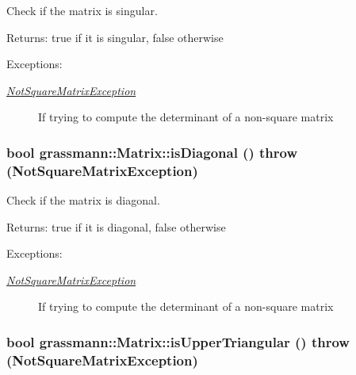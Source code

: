 Check if the matrix is singular. 

\begin{Desc}
\item[Returns:]true if it is singular, false otherwise \end{Desc}
\begin{Desc}
\item[Exceptions:]
\begin{description}
\item[{\em \hyperlink{classgrassmann_1_1NotSquareMatrixException}{NotSquareMatrixException}}]If trying to compute the determinant of a non-square matrix \end{description}
\end{Desc}
\hypertarget{classgrassmann_1_1Matrix_0ec5a24568e808ce4fc48514842e7633}{
\subsubsection[isDiagonal]{\setlength{\rightskip}{0pt plus 5cm}bool grassmann::Matrix::isDiagonal ()  throw ({\bf NotSquareMatrixException})}}
\label{classgrassmann_1_1Matrix_0ec5a24568e808ce4fc48514842e7633}


Check if the matrix is diagonal. 

\begin{Desc}
\item[Returns:]true if it is diagonal, false otherwise \end{Desc}
\begin{Desc}
\item[Exceptions:]
\begin{description}
\item[{\em \hyperlink{classgrassmann_1_1NotSquareMatrixException}{NotSquareMatrixException}}]If trying to compute the determinant of a non-square matrix \end{description}
\end{Desc}
\hypertarget{classgrassmann_1_1Matrix_9e2ca56c045111a88dd23583c4d03f8e}{
\subsubsection[isUpperTriangular]{\setlength{\rightskip}{0pt plus 5cm}bool grassmann::Matrix::isUpperTriangular ()  throw ({\bf NotSquareMatrixException})}}
\label{classgrassmann_1_1Matrix_9e2ca56c045111a88dd23583c4d03f8e}


